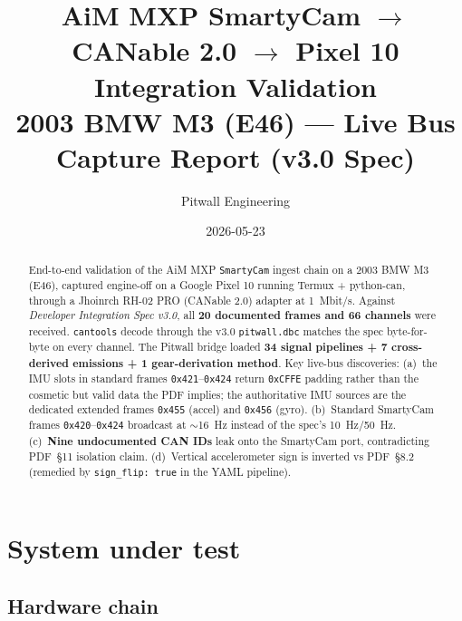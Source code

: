 \documentclass[11pt,a4paper]{article}
\title{\textbf{AiM MXP SmartyCam $\rightarrow$ CANable 2.0 $\rightarrow$ Pixel 10 Integration Validation}\\
       \large 2003 BMW M3 (E46) --- Live Bus Capture Report (v3.0 Spec)}
\author{Pitwall Engineering}
\date{2026-05-23}
\newcommand{\hex}[1]{\texttt{0x#1}}
\begin{document}
\maketitle

\begin{abstract}
\noindent
End-to-end validation of the AiM MXP \texttt{SmartyCam} ingest chain
on a 2003 BMW M3 (E46), captured engine-off on a Google Pixel 10
running Termux + python-can, through a Jhoinrch RH-02 PRO (CANable
2.0) adapter at \SI{1}{Mbit/s}. Against \emph{Developer Integration
Spec v3.0}, all \textbf{20 documented frames and 66 channels} were
received. \texttt{cantools} decode through the v3.0
\texttt{pitwall.dbc} matches the spec byte-for-byte on every channel.
The Pitwall bridge loaded \textbf{34 signal pipelines + 7 cross-derived
emissions + 1 gear-derivation method}. Key live-bus discoveries:
(a)~the IMU slots in standard frames \hex{421}--\hex{424} return
\hex{CFFE} padding rather than the cosmetic but valid data the PDF
implies; the authoritative IMU sources are the dedicated extended
frames \hex{455} (accel) and \hex{456} (gyro). (b)~Standard SmartyCam
frames \hex{420}--\hex{424} broadcast at $\sim$\SI{16}{Hz} instead of
the spec's \SI{10}{Hz}/\SI{50}{Hz}. (c)~\textbf{Nine undocumented CAN
IDs} leak onto the SmartyCam port, contradicting PDF~\S 11 isolation
claim. (d)~Vertical accelerometer sign is inverted vs PDF~\S 8.2
(remedied by \texttt{sign\_flip: true} in the YAML pipeline).
\end{abstract}

\section{System under test}

\subsection{Hardware chain}
\end{document}

